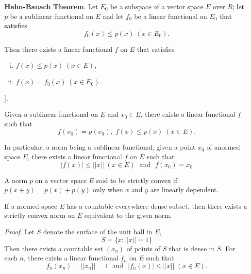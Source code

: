 \noindent
\textbf{Hahn-Banach Theorem}. Let $E_0$ be a subspace of a vector
space $E$ over $R$; let $p$ be a sublinear functional on $E$ and let 
$f_0$ be a linear functional on $E_0$ that satisfies 
$$
f_0 (x) \leq p (x)\; (x \in E_0).
$$

Then there exists a linear functional $f$ on $E$ that satisfies
\begin{enumerate}[i)]
\item $f(x) \leq p(x) \; (x \in E)$,

\item $f(x) = f_0 (x) \; (x \in E_0)$.
\end{enumerate}

\noindent
[For the proof refer to Dunford and Schwartz  (\cite{key14}, p. 62) or  Day
  \cite[p.9]{key13}]. 

\begin{coro*}%
  Given a sublinear functional on $E$ and $x_0 \in E$, there exists a
  linear functional $f$ such that 
  $$
  f (x_0) = p(x_0), \; f(x) \leq p(x) \; (x \in E).
  $$
\end{coro*}

In particular, a norm being a sublinear functional, given a point
$x_0$ of a\pageoriginale normed space $E$, there exists a linear
functional $f$ on $E$ such that  
$$
|f(x)| \leq ||x || \; (x \in E) \text{~ and~ } f(x_0) = x_0
$$

\begin{defi*}%
  A norm $p$ on a vector space $E$ said to be strictly convex if $p
  (x+y) = p(x) + p(y)$ only when $x$ and $y$ are linearly dependent. 
\end{defi*}

\setcounter{thmm}{0}
\begin{thmm}[Clarkson]\label{chap2:thm2.1}%
  If a normed space $E$ has a countable everywhere dense subset, then
  there exists a strictly  convex norm on $E$ equivalent to the given
  norm. 
\end{thmm}

\noindent \textit{Proof.}
  Let $S$ denote the surface of the unit ball in $E$,
  $$
  S = \{ x : ||x|| = 1 \}
  $$
  Then there exists a countable set $(x_n)$ of points of $S$ that is
  dense in $S$. For each $n$, there exists a linear functional $f_n$
  on $E$ such  that
  \begin{equation*}
  f_n (x_n) = || x_n|| =1 \text{~ and~ } |f_n (x)| \leq || x|| \; (x \in
  E).\tag*{$\Box$} 
  \end{equation*}

